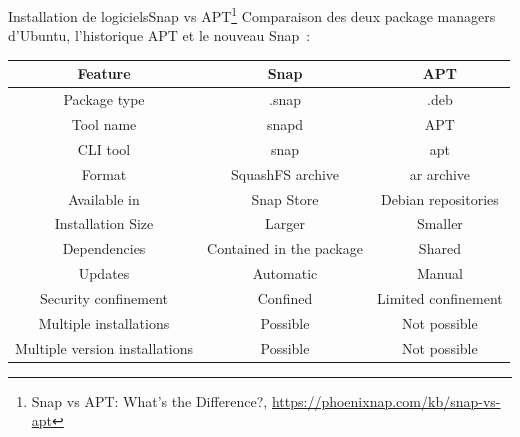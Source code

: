 \documentclass{beamer}
\begin{document}
    \begin{frame}{Installation de logiciels}{Snap vs APT\footnote{Snap vs APT: What's the Difference?, \url{https://phoenixnap.com/kb/snap-vs-apt}}}
        Comparaison des deux package managers d'Ubuntu, l'historique APT et le nouveau Snap~:
        \begin{footnotesize}
            \begin{table}[h!]
                \centering
                \begin{tabular}{|c|c|c|}
                    \hline
                    \textbf{Feature}               & \textbf{Snap}            & \textbf{APT}        \\
                    \hline
                    Package type                   & .snap                    & .deb                \\
                    \hline
                    Tool name                      & snapd                    & APT                 \\
                    \hline
                    CLI tool                       & snap                     & apt                 \\
                    \hline
                    Format                         & SquashFS archive         & ar archive          \\
                    \hline
                    Available in                   & Snap Store               & Debian repositories \\
                    \hline
                    Installation Size              & Larger                   & Smaller             \\
                    \hline
                    Dependencies                   & Contained in the package & Shared              \\
                    \hline
                    Updates                        & Automatic                & Manual              \\
                    \hline
                    Security confinement           & Confined                 & Limited confinement \\
                    \hline
                    Multiple installations         & Possible                 & Not possible        \\
                    \hline
                    Multiple version installations & Possible                 & Not possible        \\
                    \hline
                \end{tabular}
            \end{table}
        \end{footnotesize}
    \end{frame}
\end{document}
